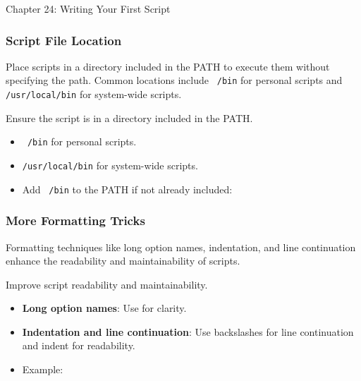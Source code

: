 \begin{notes}{Chapter 24: Writing Your First Script}
\begin{highlight}
    \end{highlight}
    
    \subsubsection*{Script File Location}
    
    Place scripts in a directory included in the PATH to execute them without specifying the path. Common locations include \texttt{~/bin} for personal scripts and \texttt{/usr/local/bin} for system-wide scripts.
    
    \begin{highlight}
    
    Ensure the script is in a directory included in the PATH.
    
    \begin{itemize}
        \item \texttt{~/bin} for personal scripts.
        \item \texttt{/usr/local/bin} for system-wide scripts.
        \item Add \texttt{~/bin} to the PATH if not already included:
    \end{itemize}
    
    
    \end{highlight}
    
    \subsubsection*{More Formatting Tricks}
    
    Formatting techniques like long option names, indentation, and line continuation enhance the readability and maintainability of scripts.
    
    \begin{highlight}
    
    Improve script readability and maintainability.
    
    \begin{itemize}
        \item \textbf{Long option names}: Use for clarity.
        \item \textbf{Indentation and line continuation}: Use backslashes for line continuation and indent for readability.
        \item Example:
    \end{itemize}
    

\end{highlight}
\end{notes}
